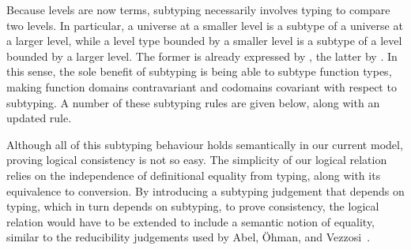 \documentclass[a4paper,UKenglish,cleveref,autoref,thm-restate]{lipics-v2021}
\newcommand{\citep}[1]{\cite{#1}}
\begin{document}
Because levels are now terms,
subtyping necessarily involves typing to compare two levels.
In particular, a universe at a smaller level is a subtype of a universe at a larger level,
while a level type bounded by a smaller level is a subtype of a level bounded by a larger level.
The former is already expressed by , the latter by .
In this sense, the sole benefit of subtyping is being able to subtype function types,
making function domains contravariant and codomains covariant with respect to subtyping.
A number of these subtyping rules are given below,
along with an updated  rule.
%

Although all of this subtyping behaviour holds semantically in our current model,
proving logical consistency is not so easy.
The simplicity of our logical relation relies on
the independence of definitional equality from typing,
along with its equivalence to conversion.
By introducing a subtyping judgement that depends on typing,
which in turn depends on subtyping, to prove consistency,
the logical relation would have to be extended to include a semantic notion of equality,
similar to the reducibility judgements used by Abel, \"Ohman, and Vezzosi~\citep{dec-conv}.



\end{document}

